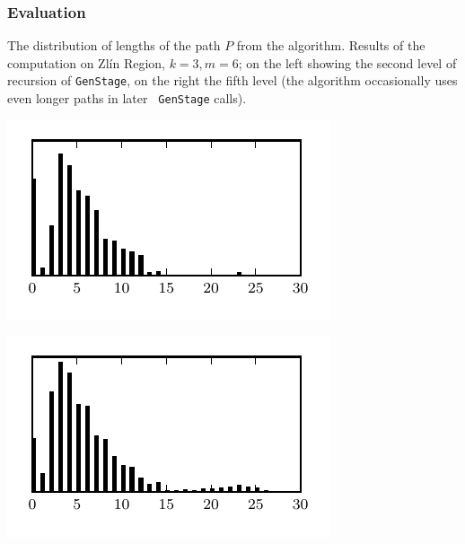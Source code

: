 \documentclass[10pt]{beamer}
\begin{document}
\begin{frame}
	\frametitle{Evaluation}

\begin{table}[t]
	\centering
	\caption{The distribution of lengths of the path $P$ from the algorithm.
	Results of the computation on Zlín Region, $k = 3, m = 6$;
	on the left showing the second level of recursion of {\tt GenStage}, on the right
	the fifth level (the algorithm occasionally uses even longer paths in later {\tt
		GenStage} calls).}
	\label{tab:pathlengths}

	\begin{minipage}[b]{0.49\linewidth}\centering
		\includegraphics[scale=0.95]{fig/zlin_6_3_stage1_xsize2.pdf}
	\end{minipage}
	\begin{minipage}[b]{0.49\linewidth}\centering
		\includegraphics[scale=0.95]{fig/zlin_6_3_stage1_xsize5.pdf}
	\end{minipage}
\end{table}


\end{frame}
\end{document}
